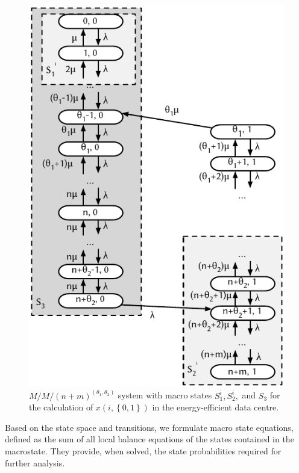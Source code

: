 \begin{figure}
  \centering
  \includegraphics{cloud/data_centers/modeling/figures/state_diagram}
  \caption{\(M/M/(n+m)^{(\theta_1, \theta_2)}\) system with macro states \(S_1^i, S_2^i,\) and \(S_3\) for the calculation of \(x(i, \left\{0, 1\right\})\) in the energy-efficient data centre.}
  \label{fig:cloud:data_centers:modeling:energy_efficient:state_diagram}
\end{figure}

Based on the state space and transitions, we formulate macro state equations, defined as the sum of all local balance equations of the states contained in the macrostate.
They provide, when solved, the state probabilities required for further analysis. 

